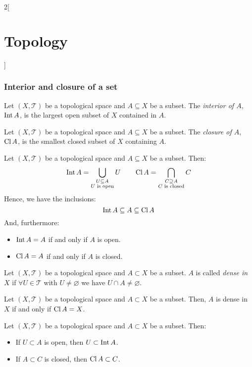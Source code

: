 \documentclass[../../../main.tex]{subfiles}
\begin{document}
\begin{multicols}{2}[\section{Topology}]
  \subsubsection*{Interior and closure of a set}
  \begin{definition}[Interior]
    Let $(X,\mathcal{T})$ be a topological space and $A\subseteq X$ be a subset. The \textit{interior of $A$}, $\operatorname{Int} A$, is the largest open subset of $X$ contained in $A$.
  \end{definition}
  \begin{definition}[Closure]
    Let $(X,\mathcal{T})$ be a topological space and $A\subseteq X$ be a subset. The \textit{closure of $A$}, $\operatorname{Cl} A$, is the smallest closed subset of $X$ containing $A$.
  \end{definition}
  \begin{prop}
    Let $(X,\mathcal{T})$ be a topological space and $A\subseteq X$ be a subset. Then: $$\operatorname{Int} A=\bigcup_{\substack{U\subseteq A\\U\text{ is open}}}U\qquad\operatorname{Cl} A=\bigcap_{\substack{C\supseteq A\\C\text{ is closed}}}C$$
    Hence, we have the inclusions: $$\operatorname{Int} A\subseteq A\subseteq \operatorname{Cl} A$$
    And, furthermore:
    \begin{itemize}
      \item $\operatorname{Int} A=A$ if and only if $A$ is open.
      \item $\operatorname{Cl} A=A$ if and only if $A$ is closed.
    \end{itemize}
  \end{prop}
  \begin{definition}
    Let $(X,\mathcal{T})$ be a topological space and $A\subset X$ be a subset. $A$ is called \textit{dense in $X$} if $\forall U\in\mathcal{T}$ with $U\ne\varnothing$ we have $U\cap A\ne\varnothing$.
  \end{definition}
  \begin{prop}
    Let $(X,\mathcal{T})$ be a topological space and $A\subset X$ be a subset. Then, $A$ is dense in $X$ if and only if $\operatorname{Cl} A=X$.
  \end{prop}
  \begin{prop}
    Let $(X,\mathcal{T})$ be a topological space and $A\subset X$ be a subset. Then:
    \begin{itemize}
      \item If $U\subset A$ is open, then $U\subset\operatorname{Int} A$.
      \item If $A\subset C$ is closed, then $\operatorname{Cl} A\subset C$.
    \end{itemize}

\end{prop}
\end{multicols}
\end{document}

